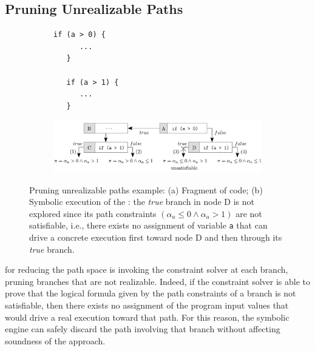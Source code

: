 \subsection{Pruning Unrealizable Paths}
\label{ss:unrealizable-paths}

\begin{figure}[t]
  \begin{subfigure}{.29\textwidth}
    \vspace{0mm}
    \begin{lstlisting}[basicstyle=\ttfamily\scriptsize]
   if (a > 0) {
      ...
   } 

   if (a > 1) {
      ...
   }
    \end{lstlisting}
    \vspace{-0.7mm}
    \caption{}
  \end{subfigure}%
  \begin{subfigure}{.70\textwidth}
    \centering
    \includegraphics[width=1.0\columnwidth]{images/eager-evaluation} 
    \vspace{-5mm}
    \caption{}
  \end{subfigure}%
  \vspace{-2mm}
  \caption{Pruning unrealizable paths example: (a) Fragment of code; (b) Symbolic execution of the : the {\em true} branch in node D is not explored since its path constraints $(\alpha_a \leq 0 \wedge \alpha_a > 1)$ are not satisfiable, i.e., there exists no assignment of variable {\tt a} that can drive a concrete execution first toward node D and then through its {\em true} branch.}
  \label{fig:eager-evaluation}
\end{figure}

 for reducing the path space is invoking the constraint solver at each branch, pruning branches that are not realizable. Indeed, if the constraint solver is able to prove that the logical formula given by the path constraints of a branch is not satisfiable, then there exists no assignment of the program input values that would drive a real execution toward that path. For this reason, the symbolic engine can safely discard the path involving that branch without affecting soundness of the approach. 

